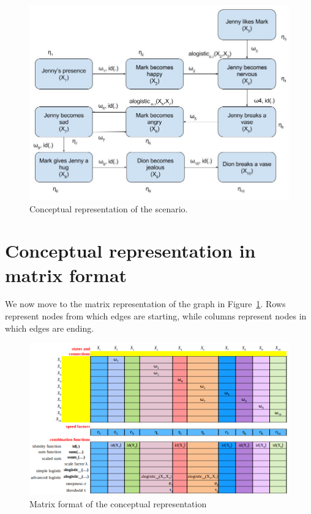 \documentclass[a4paper]{article}
\begin{document}
\begin{figure}[!htbp]
\center
\includegraphics[width=\textwidth]{res/img/graphical_conceptual_representation}
\caption{Conceptual representation of the scenario.}
\label{fig:graphical_conceptual_representation}
\end{figure}

\section{Conceptual representation in matrix format}

We now move to the matrix representation of the graph in Figure~\ref{fig:graphical_conceptual_representation}. Rows represent nodes from which edges are starting, while columns represent nodes in which edges are ending.

\begin{figure}[!htbp]
\centering
\includegraphics[width=\textwidth]{res/img/matrix_conceptual_representation}
\caption{Matrix format of the conceptual representation}
\label{fig:matrix_conceptual_representation}
\end{figure}
\end{document}
